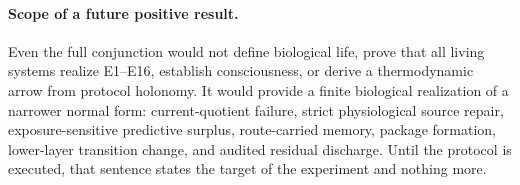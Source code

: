 \paragraph{Scope of a future positive result.}
Even the full conjunction would not define biological life, prove that all
living systems realize E1--E16, establish consciousness, or derive a
thermodynamic arrow from protocol holonomy.  It would provide a finite
biological realization of a narrower normal form: current-quotient failure,
strict physiological source repair, exposure-sensitive predictive surplus,
route-carried memory, package formation, lower-layer transition change, and
audited residual discharge.  Until the protocol is executed, that sentence
states the target of the experiment and nothing more.


